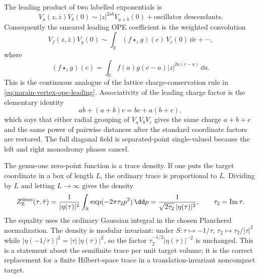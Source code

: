 The leading product of two labelled exponentials is
\begin{equation}
  V_a(z,\bar z)V_b(0)
  \sim
  |z|^{2ab}V_{a+b}(0)+\text{oscillator descendants}.
  \label{eq:noncompact-boson-labelled-ope}
\end{equation}
Consequently the smeared leading OPE coefficient is the weighted convolution
\begin{equation}
  V_f(z,\bar z)V_g(0)
  \sim
  \int_{\mathbb R}
  (f\star_z g)(c)\,V_c(0)\,\dd c+\cdots ,
  \label{eq:noncompact-boson-smeared-ope}
\end{equation}
where
\begin{equation}
  (f\star_z g)(c)
  =
  \int_{\mathbb R}
  f(a)g(c-a)|z|^{2a(c-a)}\,\dd a .
  \label{eq:noncompact-boson-weighted-convolution}
\end{equation}
This is the continuous analogue of the lattice charge-conservation rule in
\eqref{eq:narain-vertex-ope-leading}.  Associativity of the leading charge
factor is the elementary identity
\begin{equation}
  ab+(a+b)c=bc+a(b+c),
  \label{eq:noncompact-boson-ope-associativity-exponent}
\end{equation}
which says that either radial grouping of \(V_aV_bV_c\) gives the same
charge \(a+b+c\) and the same power of pairwise distances after the standard
coordinate factors are restored.  The full diagonal field is separated-point
single-valued because the left and right monodromy phases cancel.

The genus-one zero-point function is a trace density.  If one puts the target
coordinate in a box of length \(L\), the ordinary trace is proportional to
\(L\).  Dividing by \(L\) and letting \(L\to\infty\) gives the density
\begin{equation}
  Z_{\mathbb R}^{\rm dens}(\tau,\bar\tau)
  =
  \frac{1}{|\eta(\tau)|^2}
  \int_{\mathbb R}
  \exp(-2\pi\tau_2p^2)\,\dd p
  =
  \frac{1}{\sqrt{2\tau_2}\,|\eta(\tau)|^2},
  \qquad
  \tau_2=\operatorname{Im}\tau .
  \label{eq:noncompact-boson-partition-density}
\end{equation}
The equality uses the ordinary Gaussian integral in the chosen Plancherel
normalization.  The density is modular invariant: under
\(S:\tau\mapsto-1/\tau\), \(\tau_2\mapsto\tau_2/|\tau|^2\) while
\(|\eta(-1/\tau)|^2=|\tau|\,|\eta(\tau)|^2\), so the factor
\(\tau_2^{-1/2}|\eta(\tau)|^{-2}\) is unchanged.  This is a statement about
the semifinite trace per unit target volume; it is the correct replacement
for a finite Hilbert-space trace in a translation-invariant noncompact
target.

